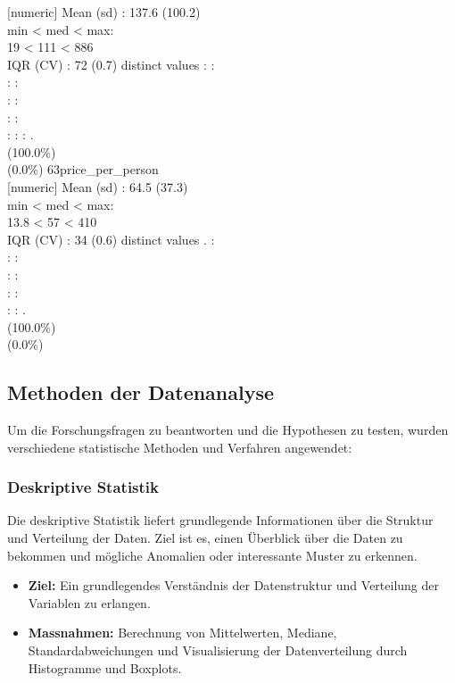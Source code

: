 \documentclass[
  journal,
]{IEEEtran}%
\begin{document}
{[}numeric{]} \textbar Mean (sd) : 137.6 (100.2)\\
min \textless{} med \textless{} max:\\
19 \textless{} 111 \textless{} 886\\
IQR (CV) : 72 (0.7)  distinct values \textbar{} \textbar: :\\
: :\\
: :\\
: :\\
: : : . \\
(100.0\%) \\
(0.0\%) \textbar{} \textbar{} 63\textbar price\_per\_person\\
{[}numeric{]} \textbar Mean (sd) : 64.5 (37.3)\\
min \textless{} med \textless{} max:\\
13.8 \textless{} 57 \textless{} 410\\
IQR (CV) : 34 (0.6)  distinct values \textbar{} \textbar. :\\
: :\\
: :\\
: :\\
: : . \\
(100.0\%) \\
(0.0\%) \textbar{}

\subsection{Methoden der Datenanalyse}\label{methoden-der-datenanalyse}

Um die Forschungsfragen zu beantworten und die Hypothesen zu testen,
wurden verschiedene statistische Methoden und Verfahren angewendet:

\subsubsection{\texorpdfstring{\textbf{Deskriptive
Statistik}}{Deskriptive Statistik}}\label{deskriptive-statistik}

Die deskriptive Statistik liefert grundlegende Informationen über die
Struktur und Verteilung der Daten. Ziel ist es, einen Überblick über die
Daten zu bekommen und mögliche Anomalien oder interessante Muster zu
erkennen.

\begin{itemize}
\item
  \textbf{Ziel:} Ein grundlegendes Verständnis der Datenstruktur und
  Verteilung der Variablen zu erlangen.
\item
  \textbf{Massnahmen:} Berechnung von Mittelwerten, Mediane,
  Standardabweichungen und Visualisierung der Datenverteilung durch
  Histogramme und Boxplots.
\end{itemize}
\end{document}
